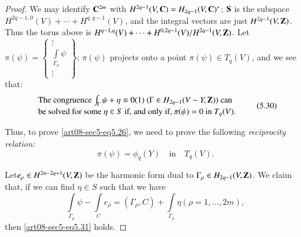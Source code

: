 \begin{proof}
We may identify $\mathbf{C}^{2m}$ with $H^{2q-1}(V,\mathbf{C})=H_{2q-1}(V,\mathbf{C})^{*}$; $\mathbf{S}$ is the subspace $H^{2q-1,0}(V)+\cdots+H^{q,q-1}(V)$, and the integral vectors are just $H^{2q-1}(V,\mathbf{Z})$. Thus the torus above is $H^{q-1,q}(V)+\cdots+H^{0,2q-1}(V)/\break H^{2q-1}(V,\bfZ)$. Let $\pi(\psi)=\left\{\begin{smallmatrix} \vdots\\ \int\limits_{\Gamma_{\rho}}\psi\\ \vdots\end{smallmatrix}\right\}$; $\pi(\psi)$ projects onto a point $\pi(\psi)\in T_{q}(V)$, and we see that:
\begin{equation*}
\begin{array}{l}
\text{The congruence $\int_{\Gamma}\psi+\eta\equiv 0(1)$ $(\Gamma\in H_{2q-1}(V-Y,\mathbf{Z}))$ can}\\[2pt]
\text{be solved for some $\eta\in S$ if, and only if, $\pi(\psi)=0$ in $T_{q}(V)$.}
\end{array}\tag{5.30}\label{art08-sec5-eq5.30}
\end{equation*}

Thus, to prove \eqref{art08-sec5-eq5.26}, we need to prove the following {\em reciprocity relation:}
\begin{equation*}
\pi(\psi)=\phi_{q}(Y)\text{~~ in~~ } T_{q}(V).\tag{5.31}\label{art08-sec5-eq5.31}
\end{equation*}

Let\pageoriginale $e_{\rho}\in H^{2n-2q+1}(V,\mathbf{Z})$ be the harmonic form dual to $\Gamma_{\rho}\in H_{2q-1}\break (V,\bfZ)$. We claim that, if we can find $\eta\in S$ such that we have
\begin{equation*}
\int\limits_{\Gamma_{\rho}}\psi-\int\limits_{C}e_{\rho}=(\Gamma_{\rho},C)+\int\limits_{\Gamma_{\rho}}\eta(\rho=1,\ldots,2m),\tag{5.32}\label{art08-sec5-eq5.32}
\end{equation*}
then \eqref{art08-sec5-eq5.31} holds.
\end{proof}

